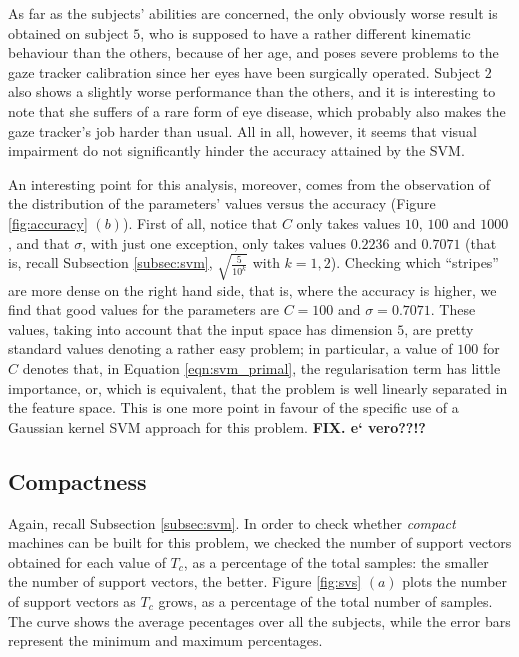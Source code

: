 \documentclass[a4paper,10pt,conference]{ieeeconf}
\begin{document}
As far as the subjects' abilities are concerned, the only obviously
worse result is obtained on subject $5$, who is supposed to have a
rather different kinematic behaviour than the others, because of her
age, and poses severe problems to the gaze tracker calibration since
her eyes have been surgically operated. Subject $2$ also shows a
slightly worse performance than the others, and it is interesting to
note that she suffers of a rare form of eye disease, which probably
also makes the gaze tracker's job harder than usual. All in all,
however, it seems that visual impairment do not significantly hinder
the accuracy attained by the SVM.

An interesting point for this analysis, moreover, comes from the
observation of the distribution of the parameters' values versus the
accuracy (Figure \ref{fig:accuracy} $(b)$). First of all, notice that
$C$ only takes values $10$, $100$ and $1000$, and that $\sigma$, with
just one exception, only takes values $0.2236$ and $0.7071$ (that is,
recall Subsection \ref{subsec:svm}, $\sqrt{\frac{5}{10^{k}}}$ with
$k=1,2$). Checking which ``stripes'' are more dense on the right hand
side, that is, where the accuracy is higher, we find that good values
for the parameters are $C=100$ and $\sigma=0.7071$. These values,
taking into account that the input space has dimension $5$, are pretty
standard values denoting a rather easy problem; in particular, a value
of $100$ for $C$ denotes that, in Equation \ref{eqn:svm_primal}, the
regularisation term has little importance, or, which is equivalent,
that the problem is well linearly separated in the feature space. This
is one more point in favour of the specific use of a Gaussian kernel
SVM approach for this problem. {\bf FIX. e` vero??!?}

\subsection{Compactness}

Again, recall Subsection \ref{subsec:svm}. In order to check whether
\emph{compact} machines can be built for this problem, we checked the
number of support vectors obtained for each value of $T_c$, as a
percentage of the total samples: the smaller the number of support
vectors, the better. Figure \ref{fig:svs} $(a)$ plots the number of
support vectors as $T_c$ grows, as a percentage of the total number of
samples. The curve shows the average pecentages over all the subjects,
while the error bars represent the minimum and maximum percentages.
\end{document}
